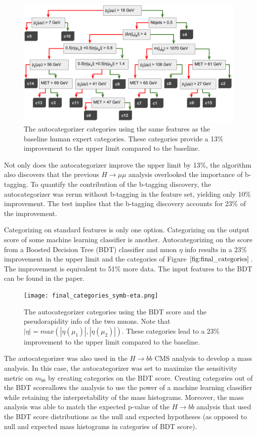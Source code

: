 \documentclass[review]{elsarticle}
\begin{document}
\begin{figure}[hbp]
  \centering
  \includegraphics[width=0.98\linewidth]{autocat_categories.png}
  \caption
  {The autocategorizer categories using the same features as the baseline human expert categories. These categories provide a 13\% improvement to the upper limit compared to the baseline.}
  \label{fig:autocats}
\end{figure}

Not only does the autocategorizer improve the upper limit by 13\%, the algorithm also discovers that the previous $H\rightarrow\mu\mu$ analysis overlooked the importance of b-tagging. To quantify the contribution of the b-tagging discovery, the autocategorizer was rerun without b-tagging in the feature set, yielding only 10\% improvement. The test implies that the b-tagging discovery accounts for 23\% of the improvement. 

Categorizing on standard features is only one option. Categorizing on the output score of some machine learning classifier is another. Autocategorizing on the score from a Boosted Decision Tree (BDT) classifier and muon $\eta$ info results in a 23\% improvement in the upper limit and the categories of Figure $\ref{fig:final_categories}$. The improvement is equivalent to 51\% more data. The input features to the BDT can be found in the paper.
\begin{figure}[hbp]
  \centering
  \texttt{[image: final\_categories\_symb-eta.png]}
  \caption
  {The autocategorizer categories using the BDT score and the pseudorapidity info of the two muons. Note that $|\eta| = max(|\eta(\mu_1)|,|\eta(\mu_2)|)$. These categories lead to a 23\% improvement to the upper limit compared to the baseline.}
  \label{fig:final_categories}
\end{figure}

The autocategorizer was also used in the $H\rightarrow bb$ CMS analysis to develop a mass analysis. In this case, the autocategorizer was set to maximize the sensitivity metric on $m_{bb}$ by creating categories on the BDT score. Creating categories out of the BDT scoreallows the analysis to use the power of a machine learning classifier while retaining the interpretability of the mass histograms. Moreover, the mass analysis was able to match the expected p-value of the $H\rightarrow bb$ analysis that used the BDT score distributions as the null and expected hypotheses (as opposed to null and expected mass histograms in categories of BDT score). 
\end{document}
